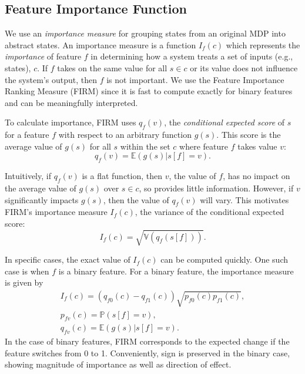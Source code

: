 \documentclass[letterpaper]{article} %
\begin{document}
\subsection{Feature Importance Function} \label{approach_featureImportanceFunction}
We use an \emph{importance measure} for grouping states from an original MDP into abstract states.
An importance measure is a function $I_f(c)$ which represents the \emph{importance} of feature $f$ in determining how a system treats a set of inputs (e.g., states), $c$.
If $f$ takes on the same value for all $s \in c$ or its value does not influence the system's output, then $f$ is not important.
We use the Feature Importance Ranking Measure (FIRM) \cite{FIRM} since it is fast to compute exactly for binary features and can be meaningfully interpreted.

To calculate importance, FIRM uses $q_f(v)$, the \textit{conditional expected score} of $s$ for a feature $f$ with respect to an arbitrary function $g(s)$.
This score is the  average value of $g(s)$ for all $s$ within the set $c$ where feature $f$ takes value $v$:
\begin{equation}
q_f(v) = \mathbb{E}(g(s) | s[f] = v).
\end{equation}

Intuitively, if $q_f(v)$ is a flat function, then $v$, the value of $f$, has no impact on the average value of $g(s)$ over $s \in c$, so provides little information.
However, if $v$ significantly impacts $g(s)$, then the value of $q_f(v)$ will vary.
This motivates FIRM's importance measure $I_f(c)$, the variance of the conditional expected score:
\begin{equation}
I_f(c) = \sqrt{\mathbb{V}(q_f(s[f]))}.
\end{equation}

In specific cases, the exact value of $I_f(c)$ can be computed quickly. One such case is when $f$ is a binary feature.
For a binary feature, the importance measure is given by
\begin{equation}
\begin{split}
I_f(c) = (q_{f0}(c) - q_{f1}(c)) \sqrt{ p_{f0}(c) p_{f1}(c)},\\
p_{fv}(c) = \mathbb{P}(s[f] = v),\\
q_{fv}(c) = \mathbb{E}(g(s) | s[f] = v).
\end{split}
\end{equation}
In the case of binary features, FIRM corresponds to the expected change if the feature switches from 0 to 1.
Conveniently, sign is preserved in the binary case, showing magnitude of importance as well as direction of effect.
\end{document}
